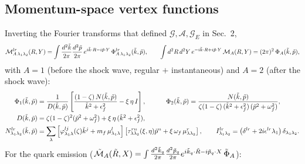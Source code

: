 \documentclass[9pt]{article}
\numberwithin{equation}{section}
\begin{document}
\subsection{Momentum-space vertex functions}
Inverting the Fourier transforms that defined $\mathcal{G},\mathcal{A},\mathcal{G}_{E}$ in Sec.~2,
\begin{align}
    \mathcal{M}^{lr}_{A\,\lambda_{1}\lambda_{2}}(R,Y) = \int\frac{d^{2}\Tilde{k}}{2\pi}\frac{d^{2}\Tilde{p}}{2\pi}\,e^{i\Tilde{k}\cdot R-i\Tilde{p}\cdot Y}\,\Phi^{lr}_{A\,\lambda_{1}\lambda_{2}}(\Tilde{k},\Tilde{p}),\hspace{2em}\int d^{2}R\,d^{2}Y\,e^{-i\Tilde{k}\cdot R+i\Tilde{p}\cdot Y}\,\mathcal{M}_{A}(R,Y) = (2\pi)^{2}\,\Phi_{A}(\Tilde{k},\Tilde{p}),
\end{align}
with $A=1$ (before the shock wave, regular $+$ instantaneous) and $A=2$ (after the shock wave):
\begin{align}\label{eq:Phiqb}
    \Phi_{1}(\Tilde{k},\Tilde{p}) & = \frac{1}{D(\Tilde{k},\Tilde{p})}\left[\frac{(1-\zeta)\,N(\Tilde{k},\Tilde{p})}{\Tilde{k}^{2}+\epsilon^{2}_{f}}-\xi\,\eta\,I\right], \hspace{3em} \Phi_{2}(\Tilde{k},\Tilde{p}) = \frac{N(\Tilde{k},\Tilde{p})}{\zeta(1-\zeta)\,(\Tilde{k}^{2}+\epsilon^{2}_{f})\,(\Tilde{p}^{2}+\omega^{2}_{f})},\notag \\
    D(\Tilde{k},\Tilde{p}) & = \zeta(1-\zeta)^{2}(\Tilde{p}^{2}+\omega^{2}_{f})+\xi\,\eta\,(\Tilde{k}^{2}+\epsilon^{2}_{f}),\notag \\
    N^{lr}_{\lambda_{1}\lambda_{2}}(\Tilde{k},\Tilde{p}) & = \sum_{\lambda}\left[\varphi^{lj}_{\lambda_{1}\lambda}(\zeta)\Tilde{k}^{j}+m_{f}\,\mu^{l}_{\lambda_{1}\lambda}\right]\left[\tau^{rn}_{\lambda\lambda_{2}}(\xi,\eta)\Tilde{p}^{n}+\xi\,\omega_{f}\,\mu^{r}_{\lambda\lambda_{2}}\right],\hspace{2em} I^{lr}_{\lambda_{1}\lambda_{2}} = \left(\delta^{lr}+2i\epsilon^{lr}\lambda_{1}\right)\delta_{\lambda_{1}\lambda_{2}}.
\end{align}
For the quark emission ($\mathcal{\Tilde{M}}_{A}(\Tilde{R},X)=\int\frac{d^{2}\Tilde{k}_{q}}{2\pi}\frac{d^{2}\Tilde{p}_{q}}{2\pi}e^{i\Tilde{k}_{q}\cdot\Tilde{R}-i\Tilde{p}_{q}\cdot X}\,\Tilde{\Phi}_{A}$):
\end{document}
